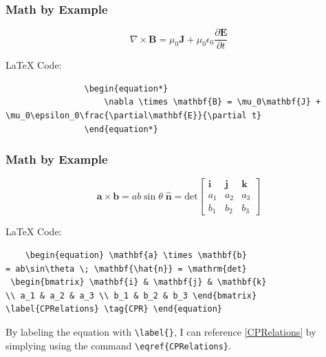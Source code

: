 \documentclass{beamer}
\begin{document}
\begin{frame}[containsverbatim]
    \frametitle{Math by Example}
    \begin{equation*}
        \nabla \times \mathbf{B} = \mu_0\mathbf{J} + \mu_0\epsilon_0\frac{\partial\mathbf{E}}{\partial t}
    \end{equation*}

    \begin{block}{\LaTeX{ }Code:}
            \begin{verbatim}
                \begin{equation*}
                    \nabla \times \mathbf{B} = \mu_0\mathbf{J} + 
\mu_0\epsilon_0\frac{\partial\mathbf{E}}{\partial t}
                \end{equation*}
            \end{verbatim}
    \end{block}
\end{frame}

\begin{frame}[containsverbatim]
    \frametitle{Math by Example}
    \begin{equation} \mathbf{a} \times \mathbf{b} = ab\sin\theta \; \mathbf{\hat{n}} = \mathrm{det} \begin{bmatrix} \mathbf{i} & \mathbf{j} & \mathbf{k} \\ a_1 & a_2 & a_3 \\ b_1 & b_2 & b_3 \end{bmatrix} \label{CPRelations} \tag{CPR} \end{equation}

    \begin{block}{\LaTeX{ }Code:}
    \begin{verbatim}
    \begin{equation} \mathbf{a} \times \mathbf{b} 
= ab\sin\theta \; \mathbf{\hat{n}} = \mathrm{det}
 \begin{bmatrix} \mathbf{i} & \mathbf{j} & \mathbf{k}
\\ a_1 & a_2 & a_3 \\ b_1 & b_2 & b_3 \end{bmatrix} 
\label{CPRelations} \tag{CPR} \end{equation}
    \end{verbatim}
    \end{block}

    By labeling the equation with \verb|\label{}|, I can reference \eqref{CPRelations} by simplying using the command \verb|\eqref{CPRelations}|.
\end{frame}
\end{document}
